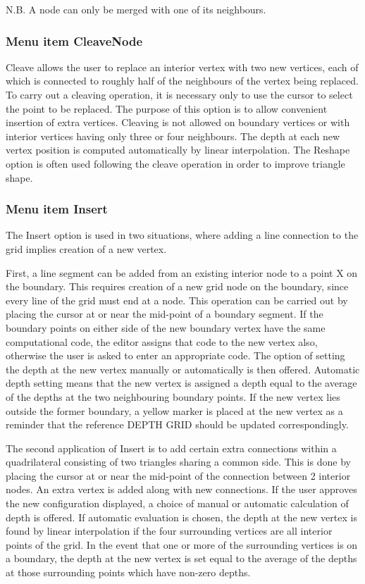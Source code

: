 \documentclass{article}
\begin{document}
N.B. A node can only be merged with one of its neighbours.

\subsubsection[Menu item CleaveNode]{Menu item CleaveNode}
Cleave allows the user to replace an interior vertex with two new vertices, each of which is connected to roughly half of the neighbours of the vertex being replaced. To carry out a cleaving operation, it is necessary only to use the cursor to select the point to be replaced. The purpose of this option is to allow convenient insertion of extra vertices. Cleaving is not allowed on boundary vertices or with interior vertices having only three or four neighbours. The depth at each new vertex position is computed automatically by linear interpolation. The Reshape option is often used following the cleave operation in order to improve triangle shape.

\subsubsection[Menu item Insert]{Menu item Insert}
The Insert option is used in two situations, where adding a line connection to the grid implies creation of a new vertex. 

First, a line segment can be added from an existing interior node to a point X on the boundary. This requires creation of a new grid node on the boundary, since every line of the grid must end at a node. This operation can be carried out by placing the cursor at or near the mid-point of a boundary segment. If the boundary points on either side of the new boundary vertex have the same computational code, the editor assigns that code to the new vertex also, otherwise the user is asked to enter an appropriate code. The option of setting the depth at the new vertex manually or automatically is then offered. Automatic depth setting means that the new vertex is assigned a depth equal to the average of the depths at the two neighbouring boundary points. If the new vertex lies outside the former boundary, a yellow marker is placed at the new vertex as a reminder that the reference DEPTH GRID should be updated correspondingly.

The second application of Insert is to add certain extra connections within a quadrilateral consisting of two triangles sharing a common side. This is done by placing the cursor at or near the mid-point of the connection between 2 interior nodes. An extra vertex is added along with new connections. If the user approves the new configuration displayed, a choice of manual or automatic calculation of depth is offered. If automatic evaluation is chosen, the depth at the new vertex is found by linear interpolation if the four surrounding vertices are all interior points of the grid. In the event that one or more of the surrounding vertices is on a boundary, the depth at the new vertex is set equal to the average of the depths at those surrounding points which have non-zero depths.
\end{document}
